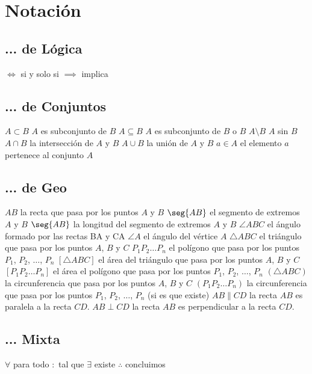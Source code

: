 \chapter{Notación}

\section{... de Lógica}

\begin{enumerate}
    \ii $\iff$ si y solo si
    \ii $\implies$ implica
\end{enumerate}

\section{... de Conjuntos}

\begin{enumerate}
    \ii $A \subset B$ $A$ es subconjunto de $B$
    \ii $A \subseteq B$ $A$ es subconjunto de $B$ o $B$
    \ii $A \setminus B$ $A$ sin $B$
    \ii $A \cap B$ la intersección de $A$ y $B$
    \ii $A \cup B$ la unión de $A$ y $B$
    \ii $a \in A$ el elemento $a$ pertenece al conjunto $A$
\end{enumerate}

\section{... de Geo}

\begin{enumerate}
    \ii $AB$ la recta que pasa por los puntos $A$ y $B$
    \ii $\seg{AB}$ el segmento de extremos $A$ y $B$
    \ii $\seg{AB}$ la longitud del segmento de extremos $A$ y $B$
    \ii $\angle ABC$ el ángulo formado por las rectas BA y CA
    \ii $\angle A$ el ángulo del vértice $A$
    \ii $\triangle ABC$ el triángulo que pasa por los puntos $A$, $B$ y $C$
    \ii $P_1P_2\dots P_n$ el polígono que pasa por los puntos $P_1$, $P_2$, $\dots$,  $P_n$
    \ii $\left[\triangle ABC\right]$ el área del triángulo que pasa por los puntos $A$, $B$ y $C$
    \ii $\left[P_1P_2\dots P_n\right]$ el área el polígono que pasa por los puntos $P_1$, $P_2$, $\dots$,  $P_n$
    \ii $\left(\triangle ABC\right)$ la circunferencia que pasa por los puntos $A$, $B$ y $C$
    \ii $\left(P_1P_2\dots P_n\right)$ la circunferencia que pasa por los puntos $P_1$, $P_2$, $\dots$,  $P_n$ (si es que existe)
    \ii $AB \parallel CD$ la recta $AB$ es paralela a la recta $CD$.
    \ii $AB \perp CD$ la recta $AB$ es perpendicular a la recta $CD$.
\end{enumerate}

\section{... Mixta}

\begin{enumerate}
    \ii $\forall$ para todo
    \ii $:$ tal que
    \ii $\exists$ existe
    \ii $\therefore$ concluimos
\end{enumerate}